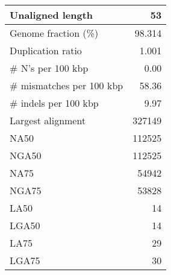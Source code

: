 \documentclass[12pt,a4paper]{article}
\begin{document}
\begin{table}[ht]
\begin{center}
\begin{tabular}{|l*{1}{|r}|}
Unaligned length & 53 \\ \hline
Genome fraction (\%) & 98.314 \\ \hline
Duplication ratio & 1.001 \\ \hline
\# N's per 100 kbp & 0.00 \\ \hline
\# mismatches per 100 kbp & 58.36 \\ \hline
\# indels per 100 kbp & 9.97 \\ \hline
Largest alignment & 327149 \\ \hline
NA50 & 112525 \\ \hline
NGA50 & 112525 \\ \hline
NA75 & 54942 \\ \hline
NGA75 & 53828 \\ \hline
LA50 & 14 \\ \hline
LGA50 & 14 \\ \hline
LA75 & 29 \\ \hline
LGA75 & 30 \\ \hline
\end{tabular}
\end{center}
\end{table}
\end{document}
